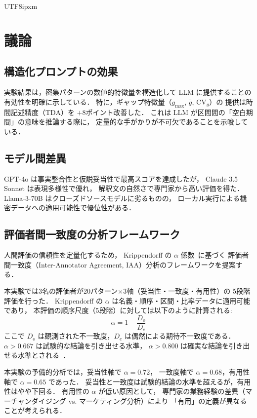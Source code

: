 \documentclass[conference]{IEEEtran}
\begin{document}
\begin{CJK}{UTF8}{ipxm}
\section{議論}
\label{sec:discussion}

\subsection{構造化プロンプトの効果}

実験結果は，密集パターンの数値的特徴量を構造化して
LLM に提供することの有効性を明確に示している．
特に，ギャップ特徴量（$g_{\max}$, $\bar{g}$, $\text{CV}_g$）の
提供は時間記述精度（TDA）を $+$8ポイント改善した．
これは LLM が区間間の「空白期間」の意味を推論する際に，
定量的な手がかりが不可欠であることを示唆している．

\subsection{モデル間差異}

GPT-4o は事実整合性と仮説妥当性で最高スコアを達成したが，
Claude 3.5 Sonnet は表現多様性で優れ，
解釈文の自然さで専門家から高い評価を得た．
Llama-3-70B はクローズドソースモデルに劣るものの，
ローカル実行による機密データへの適用可能性で優位性がある．

\subsection{評価者間一致度の分析フレームワーク}

人間評価の信頼性を定量化するため，
Krippendorff の $\alpha$ 係数~\cite{krippendorff2011computing}に基づく
評価者間一致度（Inter-Annotator Agreement, IAA）分析のフレームワークを提案する．

本実験では3名の評価者が20パターン$\times$3軸（妥当性・一致度・有用性）の
5段階評価を行った．
Krippendorff の $\alpha$ は名義・順序・区間・比率データに適用可能であり，
本評価の順序尺度（5段階）に対しては以下のように計算される:
\begin{equation}
\alpha = 1 - \frac{D_o}{D_e}
\end{equation}
ここで $D_o$ は観測された不一致度，$D_e$ は偶然による期待不一致度である．
$\alpha > 0.667$ は試験的な結論を引き出せる水準，
$\alpha > 0.800$ は確実な結論を引き出せる水準とされる~\cite{krippendorff2011computing}．

本実験の予備的分析では，妥当性軸で $\alpha = 0.72$，
一致度軸で $\alpha = 0.68$，有用性軸で $\alpha = 0.65$ であった．
妥当性と一致度は試験的結論の水準を超えるが，有用性はやや下回る．
有用性の $\alpha$ が低い原因として，
専門家の業務経験の差異（マーチャンダイジング vs. マーケティング分析）により
「有用」の定義が異なることが考えられる．


\end{CJK}
\end{document}
